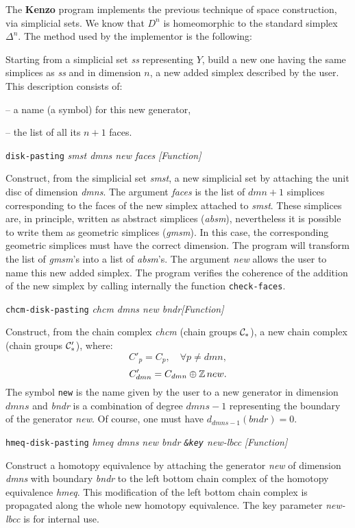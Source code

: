 The {\bf Kenzo} program implements the previous technique of  space construction, via simplicial sets.
We know that $D^n$ is homeomorphic to the standard simplex $\Delta^n$. The method used
by the implementor is the following:
\par
Starting from a simplicial set {\em ss} representing $Y$, build a new one having the same simplices
as {\em ss} and in dimension $n$, a new added simplex described by the user. This description
consists of: \par
-- a name (a symbol) for this new generator,\par
-- the list of all its $n+1$ faces. 
\newpage
{\parindent=0mm
{\leftskip=5mm 
{\tt disk-pasting} {\em smst dmns new faces }\hfill{\em [Function]} \par}
{\leftskip=15mm 
Construct, from the  simplicial set  {\em smst}, a new simplicial set
by attaching the unit disc of dimension {\em dmns}. The argument {\em faces} is the
list of  $dmn+1$  simplices corresponding to the faces of the new simplex 
attached to {\em smst}. These simplices are, in principle, written as abstract simplices 
({\em absm}), nevertheless it is possible to write them as geometric simplices ({\em gmsm}). In this case, 
the corresponding geometric simplices must have the correct dimension. The program will transform the list of
{\em gmsm}'s into a list of {\em absm}'s.  The argument {\em new} allows the user to name this new added simplex. 
The program verifies the coherence of the addition of the new simplex by calling internally the function
{\tt check-faces}.
\par}
{\leftskip=5mm 
{\tt chcm-disk-pasting} {\em chcm dmns new  bndr}\hfill{\em [Function]} \par}
{\leftskip=15mm 
Construct, from the chain complex  {\em chcm} (chain groups ${\cal C}_*$), a new chain complex 
(chain groups ${\cal C}_*'$), where:
$$C'_p=C_p,\quad \forall p \not= dmn,$$
$$C'_{dmn}= C_{dmn} \oplus {{\Bbb Z}}\, new.$$
The symbol {\tt new} is the name given by the user to a new generator in dimension $dmns$ and
{\em bndr} is a combination of degree $dmns-1$ representing the  boundary of the
generator {\em new}. Of course, one must have $d_{dmns-1}(bndr)=0.$ \par}
{\leftskip=5mm 
{\tt hmeq-disk-pasting} {\em hmeq dmns new bndr {\tt \&key} new-lbcc } \hfill{\em [Function]}\par}
{\leftskip=15mm 
Construct a homotopy equivalence by attaching  the  generator {\em new} of dimension {\em dmns} 
with boundary {\em bndr} to the left bottom chain complex of the homotopy equivalence {\em hmeq}. 
This modification of the left bottom chain complex is propagated along the whole new homotopy equivalence.
The key parameter {\em new-lbcc} is for internal use.
\par}
}

